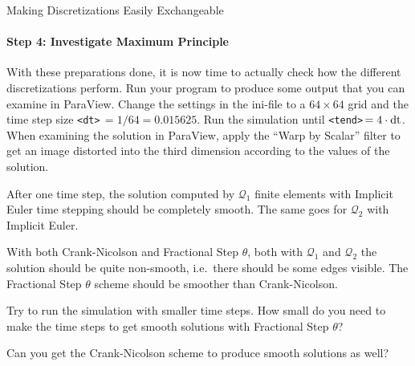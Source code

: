 \documentclass[12pt,a4paper]{article}
\begin{document}
\begin{Exercise}{Making Discretizations Easily Exchangeable}
  \paragraph{Step 4: Investigate Maximum Principle}

  \lstset{language=bash} With these preparations done, it is now time to
  actually check how the different discretizations perform.  Run your program
  to produce some output that you can examine in ParaView. Change the
  settings in the ini-file to a $64\times 64$ grid and the time step size
  \lstinline!<dt>!$\,=1/64=0.015625$. Run the simulation until
  \lstinline!<tend>!$\,=4 \cdot\textup{dt}$.
  When examining the solution in ParaView, apply the ``Warp by Scalar''
  filter to get an image distorted into the third dimension according to
  the values of the solution.

  After one time step, the solution computed by $\mathcal{Q}_1$ finite
  elements with Implicit Euler time stepping should be completely
  smooth. The same goes for $\mathcal{Q}_2$ with Implicit Euler.

  With both Crank-Nicolson and Fractional Step $\theta$, both with
  $\mathcal{Q}_1$ and $\mathcal{Q}_2$ the solution should be quite
  non-smooth, i.e.\ there should be some edges visible.  The Fractional
  Step $\theta$ scheme should be smoother than Crank-Nicolson.

  Try to run the simulation with smaller time steps.  How small do you need to
  make the time steps to get smooth solutions with Fractional Step $\theta$?

  Can you get the Crank-Nicolson scheme to produce smooth solutions as well?
\end{Exercise}
\end{document}
